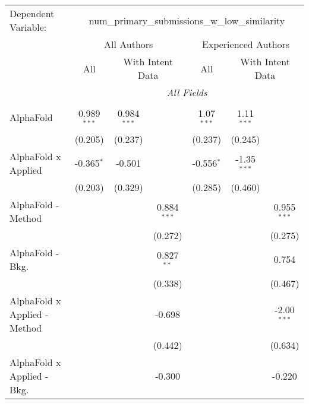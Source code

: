 \begingroup
\centering
\begin{tabular}{lcccccc}
   \tabularnewline \midrule \midrule
   Dependent Variable: & \multicolumn{6}{c}{num\_primary\_submissions\_w\_low\_similarity}\\
 & \multicolumn{3}{c}{All Authors} & \multicolumn{3}{c}{Experienced Authors} \\
\cmidrule(lr){2-4} \cmidrule(lr){5-7}
 & \multicolumn{1}{c}{All} & \multicolumn{2}{c}{With Intent Data} & \multicolumn{1}{c}{All} & \multicolumn{2}{c}{With Intent Data} \\
\cmidrule(lr){2-2} \cmidrule(lr){3-4} \cmidrule(lr){5-5} \cmidrule(lr){6-7}
 & \multicolumn{6}{c}{\textit{All Fields}} \\ \\
   AlphaFold                      & 0.989$^{***}$ & 0.984$^{***}$ &               & 1.07$^{***}$  & 1.11$^{***}$  &   \\   
                                  & (0.205)       & (0.237)       &               & (0.237)       & (0.245)       &   \\   
   AlphaFold x Applied            & -0.365$^{*}$  & -0.501        &               & -0.556$^{*}$  & -1.35$^{***}$ &   \\   
                                  & (0.203)       & (0.329)       &               & (0.285)       & (0.460)       &   \\   
   AlphaFold - Method             &               &               & 0.884$^{***}$ &               &               & 0.955$^{***}$\\   
                                  &               &               & (0.272)       &               &               & (0.275)\\   
   AlphaFold - Bkg.               &               &               & 0.827$^{**}$  &               &               & 0.754\\   
                                  &               &               & (0.338)       &               &               & (0.467)\\   
   AlphaFold x Applied - Method   &               &               & -0.698        &               &               & -2.00$^{***}$\\   
                                  &               &               & (0.442)       &               &               & (0.634)\\   
   AlphaFold x Applied - Bkg.     &               &               & -0.300        &               &               & -0.220\\   

\end{tabular}
